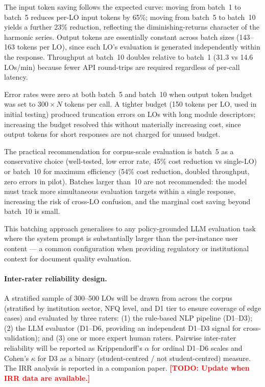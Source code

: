\documentclass[12pt, a4paper]{article}
\newcommand{\todo}[1]{\textcolor{red}{\textbf{[TODO: #1]}}}
\begin{document}
The input token saving follows the expected curve: moving from batch~1 to batch~5
reduces per-LO input tokens by 65\%; moving from batch~5 to batch~10 yields a further
23\% reduction, reflecting the diminishing-returns character of the harmonic series.
Output tokens are essentially constant across batch sizes (143--163 tokens per LO),
since each LO's evaluation is generated independently within the response. Throughput
at batch~10 doubles relative to batch~1 (31.3 vs 14.6 LOs/min) because fewer API
round-trips are required regardless of per-call latency.

Error rates were zero at both batch~5 and batch~10 when output token budget was set to
$300 \times N$ tokens per call. A tighter budget (150 tokens per LO, used in initial
testing) produced truncation errors on LOs with long module descriptors; increasing
the budget resolved this without materially increasing cost, since output tokens for
short responses are not charged for unused budget.

The practical recommendation for corpus-scale evaluation is batch~5 as a conservative
choice (well-tested, low error rate, 45\% cost reduction vs single-LO) or batch~10
for maximum efficiency (54\% cost reduction, doubled throughput, zero errors in
pilot). Batches larger than~10 are not recommended: the model must track more
simultaneous evaluation targets within a single response, increasing the risk of
cross-LO confusion, and the marginal cost saving beyond batch~10 is small.

This batching approach generalises to any policy-grounded LLM evaluation task where
the system prompt is substantially larger than the per-instance user content --- a
common configuration when providing regulatory or institutional context for document
quality evaluation.

\paragraph{Inter-rater reliability design.}
A stratified sample of 300--500 LOs will be drawn from across the corpus (stratified
by institution sector, NFQ level, and D1 tier to ensure coverage of edge cases) and
evaluated by three raters: (1) the rule-based NLP pipeline (D1--D3); (2) the LLM
evaluator (D1--D6, providing an independent D1--D3 signal for cross-validation);
and (3) one or more expert human raters. Pairwise inter-rater reliability will be
reported as Krippendorff's $\alpha$ for ordinal D1--D6 scales and Cohen's $\kappa$
for D3 as a binary (student-centred / not student-centred) measure.
The IRR analysis is reported in a companion paper.
\todo{Update when IRR data are available.}
\end{document}
